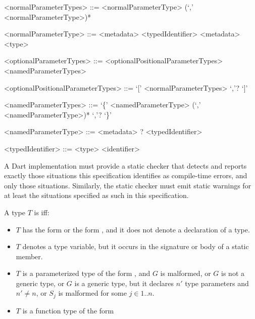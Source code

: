 \documentclass[makeidx]{article}
\begin{document}
{\begin{grammar}
<normalParameterTypes> ::= \gnewline{}
  <normalParameterType> (`,' <normalParameterType>)*

<normalParameterType> ::= <metadata> <typedIdentifier>
  \alt <metadata> <type>

<optionalParameterTypes> ::= <optionalPositionalParameterTypes>
  \alt <namedParameterTypes>

<optionalPositionalParameterTypes> ::= `[' <normalParameterTypes> `,'? `]'

<namedParameterTypes> ::=
  `\{' <namedParameterType> (`,' <namedParameterType>)* `,'? `\}'

<namedParameterType> ::=
  <metadata> \REQUIRED? <typedIdentifier>

<typedIdentifier> ::= <type> <identifier>
\end{grammar}

\LMHash{}%
A Dart implementation must provide a static checker that detects and reports
exactly those situations this specification identifies as compile-time errors,
and only those situations.
Similarly, the static checker must emit static warnings
for at least the situations specified as such in this specification.


\LMHash{}%
A type $T$ is  if{}f:

\begin{itemize}
\item
  $T$ has the form \id{} or the form ,
  and it does not denote a declaration of a type.
\item
  $T$ denotes a type variable,
  but it occurs in the signature or body of a static member.
\item
  $T$ is a parameterized type of the form ,
  and $G$ is malformed,
  or $G$ is not a generic type,
  or $G$ is a generic type,
  but it declares $n'$ type parameters and $n' \not= n$,
  or $S_j$ is malformed for some $j \in 1 .. n$.
\item
  $T$ is a function type of the form



\end{itemize}}
\end{document}
